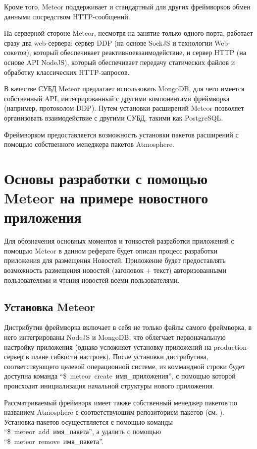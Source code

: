 \documentclass[a4paper,12pt]{article}
\begin{document}
Кроме того, Meteor поддерживает и стандартный для других фреймворков обмен данными
посредством HTTP-сообщений.

На серверной стороне Meteor, несмотря на занятие только одного порта,
работает сразу два web-сервера: сервер DDP (на основе SockJS и технологии
Web-сокетов), который обеспечивает реактивноевзаимодействие, и сервер HTTP (на
основе API NodeJS), который обеспечивает передачу статических файлов и
обработку классических HTTP-запросов.

В качестве СУБД Meteor предлагает использовать MongoDB, для чего имеется
собственный API, интегрированный с другими компонентами фреймворка (например,
протоколом DDP). Путем установки расширений Meteor позволяет организовать 
взаимодействие с другими СУБД, такими как PostgreSQL.

Фреймворком предоставляется возможность установки пакетов расширений
с помощью собственного менеджера пакетов Atmosphere.

\section{Основы разработки с помощью Meteor на примере новостного приложения}
Для обозначения основных моментов и тонкостей разработки приложений с помощью
Meteor в данном реферате будет описан процесс разработки приложения для размещения
Новостей. Приложение будет предоставлять возможность размещения новостей
(заголовок + текст) авторизованными пользователями и чтения новостей
всеми пользователями.

\subsection{Установка Meteor}

Дистрибутив фреймворка включает в себя не только файлы самого фреймворка, 
в него интегрированы NodeJS и MongoDB, что облегчает
первоначальную настройку приложения (однако усложняет установку приложений 
на production-сервер в плане гибкости настроек). После
установки дистрибутива, соответствующего целевой операционной системе,
из коммандной строки будет доступна команда ``\$~meteor~create~имя\_приложения'',
с помощью которой происходит инициализация начальной структуры нового приложения.

Рассматриваемый фреймворк имеет также собственный менеджер пакетов по названием
Atmosphere с соответствующим репозиторием пакетов (см. \cite{X}).
Установка пакетов осуществляется с помощью команды ``\$~meteor~add~имя\_пакета'',
а удалить с помощью ``\$~meteor~remove~имя\_пакета''.
\end{document}
